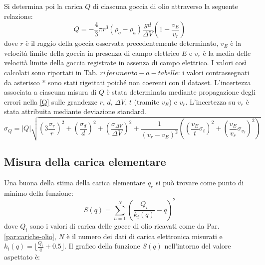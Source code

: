 \documentclass[]{article}
\let\oldsubsection\subsection%
\renewcommand{\subsection}{%
	\renewcommand{\theequation}{\thesubsection.\arabic{equation}}%
	\oldsubsection}%
\newcommand{\abs}[1]{\left\lvert#1\right\rvert}
\begin{document}
    Si determina poi la carica $Q$ di ciascuna goccia di olio attraverso la seguente relazione:
    \begin{equation}
        \label{Q}
        Q = -\frac{4}{3} \pi r^3 \left( \rho_o - \rho_a \right) \frac{g d}{\Delta V} \left( 1 - \frac{v_E}{v_r} \right)
    \end{equation}
    dove $r$ è il raggio della goccia osservata precedentemente determinato, $v_E$ è la velocità limite della goccia in presenza di campo elettrico $E$ e $v_r$ è la media delle velocità limite della goccia registrate in assenza di campo elettrico.
    I valori così calcolati sono riportati in Tab. $riferimento-a-tabelle$: i valori contrassegnati da asterisco * sono stati rigettati poiché non coerenti con il dataset.
    L'incertezza associata a ciascuna misura di $Q$ è stata determinata mediante propagazione degli errori nella \ref{Q} sulle grandezze $r$, $d$, $\Delta V$, $t$ (tramite $v_E$) e $v_r$. L'incertezza su $v_r$ è stata attribuita mediante deviazione standard.
    \begin{equation}
        \label{sigma-Q}
        \sigma_Q = \abs{Q} \sqrt{ \left( 3 \frac{\sigma_r}{r} \right)^2 + \left( \frac{\sigma_d}{d} \right)^2 + \left( \frac{\sigma_{\Delta V}}{\Delta V} \right)^2 + \frac{1}{\left( v_r - v_E \right)^2} \left( \left( \frac{v_E}{t} \sigma_t \right)^2 + \left( \frac{v_E}{v_r} \sigma_{v_r} \right)^2 \right) }
    \end{equation}

    \subsection{Misura della carica elementare}
    Una buona della stima della carica elementare $q_e$ si può trovare come punto di minimo della funzione:
    \begin{equation}
        \label{S-function}
        S(q) = \sum_{n=1}^{N} \left( \frac{Q_i}{k_i \left(q \right)} - q \right)^2
    \end{equation}
    dove $Q_i$ sono i valori di carica delle gocce di olio ricavati come da Par. \ref{par:cariche-olio}, $N$ è il numero dei dati di carica elettronica misurati e $k_i(q)=\lfloor\frac{Q_i}{q} + 0.5 \rfloor$.
    Il grafico della funzione $S(q)$ nell'intorno del valore aspettato è:
    
\end{document}
